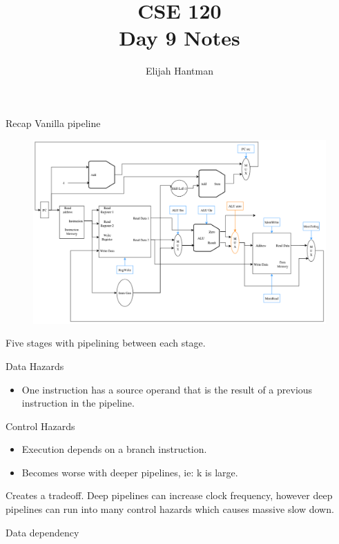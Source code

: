 \documentclass{report}
\title{\Huge{CSE 120}\\Day 9 Notes}
\author{\huge{Elijah Hantman}}
\date{}
\begin{document}
\maketitle
\newpage

\begin{description}
    \item Recap Vanilla pipeline
        \begin{figure}[h]
            \centering
            \includegraphics[scale=0.45]{modifiedDatapath}
        \end{figure}
        Five stages with pipelining between each stage.
    \item Data Hazards
        \begin{itemize}
            \item One instruction has a source operand that is
                the result of a previous instruction in the
                pipeline.
        \end{itemize}
    \item Control Hazards
        \begin{itemize}
            \item Execution depends on a branch instruction.
            \item Becomes worse with deeper pipelines, ie:
                k is large.
        \end{itemize}
        \begin{mdframed}
            Creates a tradeoff. Deep pipelines can increase
            clock frequency, however deep pipelines can
            run into many control hazards which causes massive
            slow down.
        \end{mdframed}
    \item Data dependency

\end{description}
\end{document}

